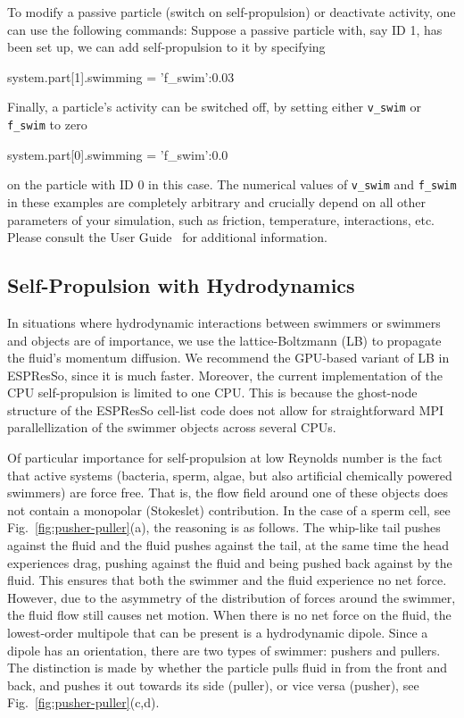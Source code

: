 \documentclass[aip,jcp,reprint,a4paper,onecolumn,amsmath]{revtex4-1}
\newcommand{\es}{\mbox{\textsf{ESPResSo}}\xspace}
\newcommand\codees{\lstinline[language=python]}
\begin{document}
To modify a passive particle (switch on self-propulsion) or deactivate
activity, one can use the following commands: Suppose a passive particle with,
say ID 1, has been set up, we can add self-propulsion to it by specifying
\begin{espresso}
system.part[1].swimming = {'f_swim':0.03}
\end{espresso}
Finally, a particle's activity can be switched off, by setting either \codees{v_swim} or \codees{f_swim} to zero
\begin{espresso}
system.part[0].swimming = {'f_swim':0.0}
\end{espresso}
on the particle with ID 0 in this case. The numerical values of \codees{v_swim}
and \codees{f_swim} in these examples are completely arbitrary and crucially
depend on all other parameters of your simulation, such as friction,
temperature, interactions, etc. Please consult the User Guide~\cite{UG} for
additional information.

\subsection{\label{sub:lattice}Self-Propulsion with Hydrodynamics}

In situations where hydrodynamic interactions between swimmers or swimmers and
objects are of importance, we use the lattice-Boltzmann (LB) to propagate the
fluid's momentum diffusion. We recommend the GPU-based variant of LB in \es{}, 
since it is much faster. Moreover, the current implementation of the CPU 
self-propulsion is limited to one CPU. This is because the ghost-node structure 
of the \es{} cell-list code does not allow for straightforward MPI parallellization 
of the swimmer objects across several CPUs.

Of particular importance for self-propulsion at low Reynolds number is the fact
that active systems (bacteria, sperm, algae, but also artificial chemically
powered swimmers) are force free. That is, the flow field around one of these
objects does not contain a monopolar (Stokeslet) contribution. In the case of a
sperm cell, see Fig.~\ref{fig:pusher-puller}(a), the reasoning is as follows.
The whip-like tail pushes against the fluid and the fluid pushes against the
tail, at the same time the head experiences drag, pushing against the fluid and
being pushed back against by the fluid. This ensures that both the swimmer and
the fluid experience no net force. However, due to the asymmetry of the
distribution of forces around the swimmer, the fluid flow still causes net
motion. When there is no net force on the fluid, the lowest-order multipole
that can be present is a hydrodynamic dipole. Since a dipole has an
orientation, there are two types of swimmer: pushers and pullers. The
distinction is made by whether the particle pulls fluid in from the front and
back, and pushes it out towards its side (puller), or vice versa (pusher), see
Fig.~\ref{fig:pusher-puller}(c,d).
\end{document}
